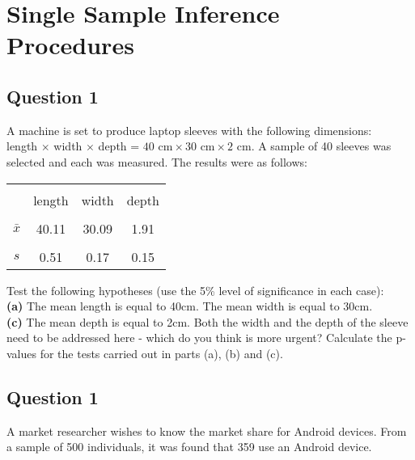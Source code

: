 \documentclass[12pt]{article}
\begin{document}
\section{Single Sample Inference Procedures}

\subsection*{Question 1}
A machine is set to produce laptop sleeves with the following dimensions:\\ length $\times$ width $\times$ depth = $40 \text{ cm} \times  30 \text{ cm} \times 2 \text{ cm}$. A sample of 40 sleeves was selected and each was measured. The results were as follows:\\[-0.2cm]
\begin{center}
	\begin{tabular}{|c|c|c|c|}
		\hline
		&&&\\[-0.4cm]
		& length & width & depth \\
		\hline
		&&&\\[-0.4cm]
		$\bar x$ & 40.11 & 30.09  & 1.91 \\
		\hline
		&&&\\[-0.4cm]
		$s$ & 0.51 & 0.17 & 0.15 \\
		\hline
	\end{tabular}
\end{center}

Test the following hypotheses (use the 5\% level of significance in each case):\\[0.2cm]
{\bf(a)} The mean length is equal to 40cm.  The mean width is equal to 30cm. \quad \\{\bf(c)} The mean depth is equal to 2cm.  Both the width and the depth of the sleeve need to be addressed here - which do you think is more urgent?   Calculate the p-values for the tests carried out in parts (a), (b) and (c).



	

\subsection*{Question 1}
A market researcher wishes to know the market share for Android devices. From a sample of 500 individuals, it was found that 359 use an Android device.\\[-0.2cm]
\end{document}
